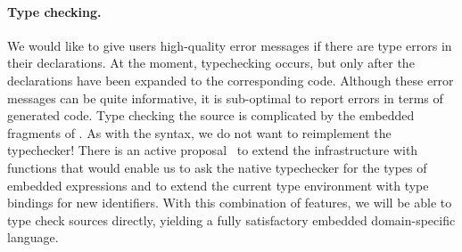 \paragraph{Type checking.}
We would like to give users high-quality error messages if there
are type errors in their \forest{} declarations.  At the moment, 
typechecking occurs, but only after the \forest{} declarations have
been expanded to the corresponding \haskell{} code.  Although these
error messages can be quite informative, it is sub-optimal to report
errors in terms of generated code.  Type checking the \forest{} source
is complicated by the embedded fragments of \haskell{}.  As with the
syntax, we do not want to reimplement the \haskell{} typechecker!  
There is an active proposal~\cite{extend-templates} to extend the \template{} infrastructure
with functions that would enable us to ask the native \haskell{}
typechecker for the types of embedded expressions and to extend the
current type environment with type bindings for new identifiers.  With
this combination of features, we will be able to type check \forest{}
sources directly, yielding a fully satisfactory embedded
domain-specific language.